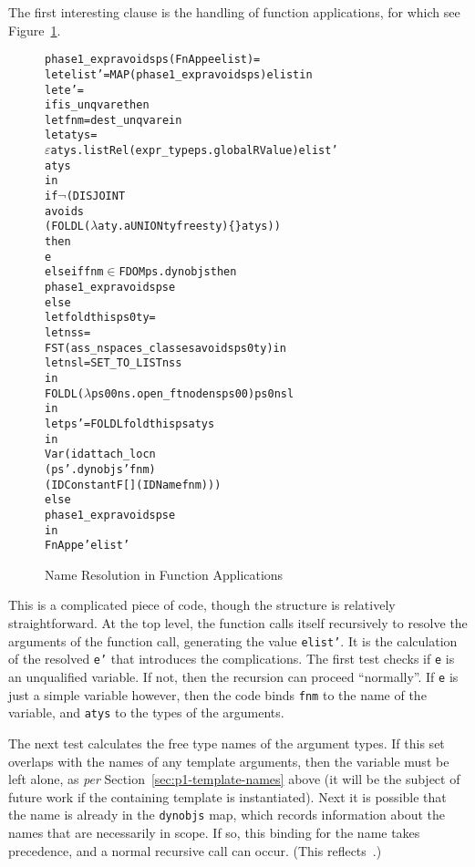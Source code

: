 \documentclass[11pt]{article}
\newcommand{\lbr}{\texttt{\{}}
\newcommand{\rbr}{\texttt{\}}}
\begin{document}
The first interesting clause is the handling of function applications,
for which see Figure~\ref{fig:phase1expr-fnapp}.
\begin{figure}[htbp]
\begin{alltt}
   phase1_expr avoids ps (FnApp e elist) =
     let elist' = MAP (phase1_expr avoids ps) elist in
     let e' =
         if is_unqvar e then
           let fnm = dest_unqvar e in
           let atys =
              \(\varepsilon\)atys. listRel (expr_type ps.global RValue) elist'
                             atys
           in
             if \(\neg\)(DISJOINT
                     avoids
                     (FOLDL (\(\lambda\)a ty. a UNION tyfrees ty) \lbr\rbr atys))
             then
               e
             else if fnm \(\in\) FDOM ps.dynobjs then
               phase1_expr avoids ps e
             else
               let foldthis ps0 ty =
                   let nss =
                     FST (ass_nspaces_classes avoids ps0 ty) in
                   let nsl = SET_TO_LIST nss
                   in
                     FOLDL (\(\lambda\)ps00 ns. open_ftnode ns ps00) ps0 nsl
               in
               let ps' = FOLDL foldthis ps atys
               in
                 Var (idattach_locn
                        (ps'.dynobjs ' fnm)
                        (IDConstant F [] (IDName fnm)))
         else
           phase1_expr avoids ps e
     in
       FnApp e' elist'
\end{alltt}
\caption{Name Resolution in Function Applications}
\label{fig:phase1expr-fnapp}
\end{figure}
This is a complicated piece of code, though the structure is
relatively straightforward.  At the top level, the function calls
itself recursively to resolve the arguments of the function call,
generating the value \texttt{elist'}.  It is the calculation of the
resolved \texttt{e'} that introduces the complications.  The first
test checks if \texttt{e} is an unqualified variable.  If not, then
the recursion can proceed ``normally''.  If \texttt{e} is just a
simple variable however, then the code binds \texttt{fnm} to the name
of the variable, and \texttt{atys} to the types of the arguments.

The next test calculates the free type names of the argument types.
If this set overlaps with the names of any template arguments, then
the variable must be left alone, as \emph{per}
Section~\ref{sec:p1-template-names} above (it will be the subject of
future work if the containing template is instantiated).  Next it is
possible that the name is already in the \texttt{dynobjs} map, which
records information about the names that are necessarily in scope.  If
so, this binding for the name takes precedence, and a normal recursive
call can occur.  (This reflects~\cite[\S3.4.2,
paragraph~2a]{cpp-standard-iso14882}.)
\end{document}
